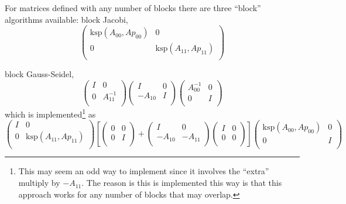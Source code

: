 For matrices defined with any number of blocks there are three ``block'' algorithms available: block Jacobi,
\[
\left( \begin{array}{cc}
  \text{ksp}(A_{00},Ap_{00})   & 0 \\
  0   & \text{ksp}(A_{11},Ap_{11}) \\
\end{array} \right)
\]

block Gauss-Seidel,
\[
\left( \begin{array}{cc}
I   & 0 \\
0 & A^{-1}_{11} \\
\end{array} \right)
\left( \begin{array}{cc}
I   & 0 \\
-A_{10} & I \\
\end{array} \right)
\left( \begin{array}{cc}
A^{-1}_{00}   & 0 \\
0 & I \\
\end{array} \right)
\]
which is implemented\footnote{This may seem an odd way to implement since it involves the ``extra'' multiply by $ -A_{11}$. The reason is this is implemented this way is that this approach works for any number of blocks that may overlap.} as
\[
\left( \begin{array}{cc}
I   & 0 \\
  0 & \text{ksp}(A_{11},Ap_{11}) \\
\end{array} \right)
\left[
\left( \begin{array}{cc}
0   & 0 \\
0 & I \\
\end{array} \right)
+
\left( \begin{array}{cc}
I   & 0 \\
-A_{10} & -A_{11} \\
\end{array} \right)
\left( \begin{array}{cc}
I   & 0 \\
0 & 0 \\
\end{array} \right)
\right]
\left( \begin{array}{cc}
  \text{ksp}(A_{00},Ap_{00})   & 0 \\
0 & I \\
\end{array} \right)
\]
